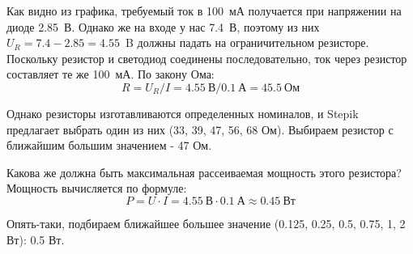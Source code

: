 Как видно из графика, требуемый ток в 100~мА получается при напряжении на диоде 2.85~В. Однако же на входе у нас 7.4~В, поэтому из них $U_R= 7.4 - 2.85 = 4.55$~B  должны падать на ограничительном резисторе. Поскольку резистор и светодиод соединены последовательно, ток через резистор составляет те же 100~мА. По закону Ома:
$$R = U_R/I = 4.55\:\text{В} / 0.1\:\text{А} = 45.5\: \text{Ом}$$

Однако резисторы изготавливаются определенных номиналов, и Stepik предлагает выбрать один из них (33, 39, 47, 56, 68 Ом).  Выбираем резистор с ближайшим большим значением - 47 Ом.  

Какова же должна быть максимальная рассеиваемая мощность этого резистора?  Мощность вычисляется по формуле:
$$P= U\cdot I = 4.55 \: \text{В} \cdot 0.1 \: \text{А} \approx 0.45 \: \text{Вт}$$

Опять-таки, подбираем ближайшее большее значение (0.125, 0.25, 0.5, 0.75, 1, 2 Вт):  0.5 Вт.

